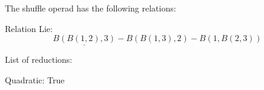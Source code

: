 \documentclass[11pt]{amsart}
\begin{document}
 
 
The shuffle operad has the following relations: 

 Relation Lie: 
 $$ 
\underline{B(B(1,2),3)} - B(B(1,3),2) - B(1,B(2,3))
 $$ 

 
 
 List of reductions: 
 

 Quadratic: True
 
\end{document}
